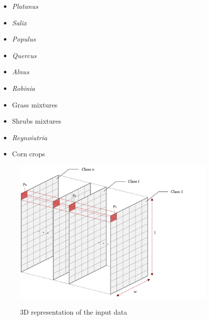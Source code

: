 \documentclass{siamart171218}
\begin{document}
\begin{center}
\begin{minipage}{0.4\textwidth}
\begin{flushleft} 
\begin{spacing}{0.5}
\begin{itemize}
    \item[\color{black}{--}] \textit{Platanus}
    \item[\color{black}{--}] \textit{Salix}
    \item[\color{black}{--}] \textit{Populus}
    \item[\color{black}{--}] \textit{Quercus}
    \item[\color{black}{--}] \textit{Alnus}
\end{itemize}
\end{spacing}
\end{flushleft}
\end{minipage}
\begin{minipage}{0.4\textwidth}
\begin{flushright}
\begin{spacing}{0.5}
\begin{itemize}
    \item[\color{black}{--}] \textit{Robinia}
    \item[\color{black}{--}] Grass mixtures
    \item[\color{black}{--}] Shrubs mixtures
    \item[\color{black}{--}] \textit{Reynoiutria}
    \item[\color{black}{--}] Corn crops 
\end{itemize}
\end{spacing}
\end{flushright}
\end{minipage}
\end{center}

\begin{figure}[H]
    \begin{center}
        \includegraphics[width=10cm]{schema_explicatif.PNG}~\\[0.1cm] 
        \caption{3D representation of the input data}
        \label{fig1}
    \end{center}
\end{figure}
\end{document}
